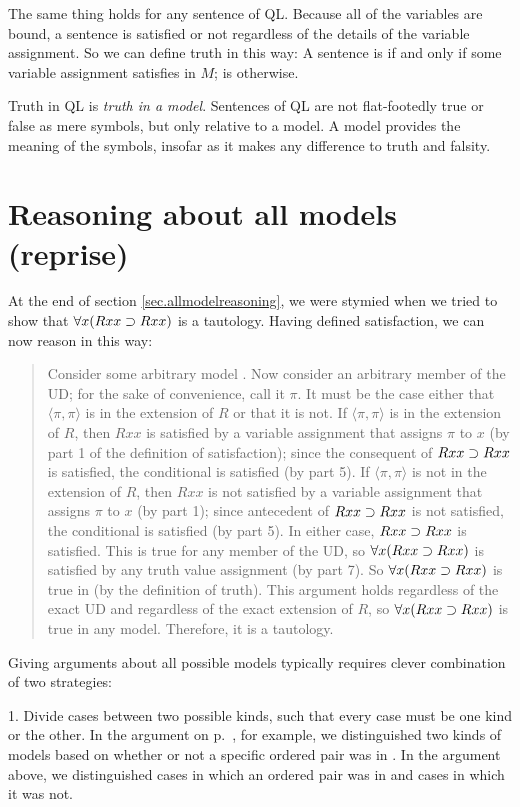 The same thing holds for any sentence of QL. Because all of the variables are bound, a sentence is satisfied or not regardless of the details of the variable assignment. So we can define truth in this way: A sentence \metaA{} is   if and only if some variable assignment satisfies \metaA{} in $M$; \metaA{} is   otherwise.

Truth in QL is \emph{truth in a model}. Sentences of QL are not flat-footedly true or false as mere symbols, but only relative to a model. A model provides the meaning of the symbols, insofar as it makes any difference to truth and falsity.


\section{Reasoning about all models (reprise)}
At the end of section \ref{sec.allmodelreasoning}, we were stymied when we tried to show that $\forall x(Rxx\supset Rxx)$ is a tautology. Having defined satisfaction, we can now reason in this way:
\begin{quote}
Consider some arbitrary model . Now consider an arbitrary member of the UD; for the sake of convenience, call it $\pi$. It must be the case either that $\langle\pi,\pi\rangle$ is in the extension of $R$ or that it is not. If $\langle\pi,\pi\rangle$ is in the extension of $R$, then $Rxx$ is satisfied by a variable assignment that assigns $\pi$ to $x$ (by part 1 of the definition of  {satisfaction}); since the consequent of $Rxx\supset Rxx$ is satisfied, the conditional is satisfied (by part 5). If $\langle\pi,\pi\rangle$ is not in the extension of $R$, then $Rxx$ is not satisfied by a variable assignment that assigns $\pi$ to $x$ (by part 1); since antecedent of $Rxx\supset Rxx$ is not satisfied, the conditional is satisfied (by part 5). In either case, $Rxx\supset Rxx$ is satisfied. This is true for any member of the UD, so $\forall x(Rxx \supset Rxx)$ is satisfied by any truth value assignment (by part 7). So $\forall x(Rxx \supset Rxx)$ is true in  (by the definition of {truth}). This argument holds regardless of the exact UD and regardless of the exact extension of $R$, so $\forall x(Rxx \supset Rxx)$ is true in any model. Therefore, it is a tautology.
\end{quote}

Giving arguments about all possible models typically requires clever combination of two strategies:

1. Divide cases between two possible kinds, such that every case must be one kind or the other.  In the argument on p.~\pageref{allmodels1}, for example, we distinguished two kinds of models based on whether or not a specific ordered pair was in . In the argument above, we distinguished cases in which an ordered pair was in  and cases in which it was not.

